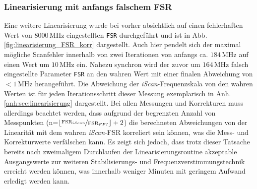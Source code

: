 \subsubsection{Linearisierung mit anfangs falschem
FSR}\label{subsubsec:linearisierung_FSR_korr}
Eine weitere Linearisierung wurde bei vorher absichtlich auf einen fehlerhaften
Wert von $8000\,$MHz eingestellten \lstinline|FSR| durchgeführt und ist in
Abb. \ref{fig:linearisierung_FSR_korr} dargestellt. Auch hier pendelt sich der
maximal mögliche Scanfehler innerhalb von zwei Iterationen von anfangs ca.
$184\,$MHz auf einen Wert um $10\,$MHz ein. Nahezu synchron wird der zuvor um
$164\,$MHz falsch eingestellte Parameter \lstinline|FSR| an den wahren Wert
mit einer finalen Abweichung von $<1\,$MHz herangeführt. Die Abweichung
der \textit{iScan}-Frequenzskala von den wahren Werten ist für jeden
Iterationsschritt dieser Messung exemplarisch in Anh.
\ref{anh:sec:linearisierung} dargestellt. Bei allen Messungen und Korrekturen
muss allerdings beachtet werden, dass aufgrund der begrenzten Anzahl von
Messpunkten (n=$\lfloor\nicefrac{\text{FSR}_{iScan}}{\text{FSR}_{FPI}}\rfloor+2$) die
berechneten Abweichungen von der Linearität mit dem wahren \textit{iScan}-FSR
korreliert sein können, was die Mess- und Korrekturwerte verfälschen kann. Es
zeigt sich jedoch, dass trotz dieser Tatsache bereits nach zweimaligem
Durchlaufen der Linearisierungsroutine akzeptable Ausgangswerte zur weiteren
Stabilisierungs- und Frequenzverstimmungstechnik erreicht werden können, was
innerhalb weniger Minuten mit geringem Aufwand erledigt werden kann.

